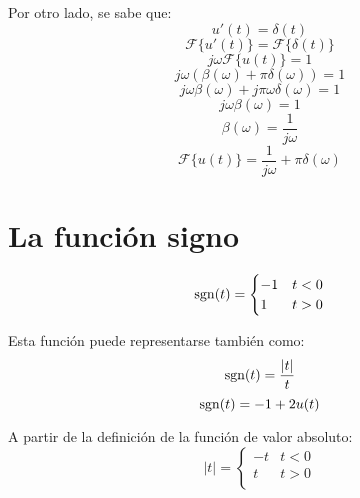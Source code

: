 Por otro lado, se sabe que:
\begin{equation*}
    u'(t)=\delta(t)
\end{equation*}
\begin{equation*}
    \mathcal{F}\{u'(t)\}=\mathcal{F}\{\delta(t)\}
\end{equation*}
\begin{equation*}
    j\omega\mathcal{F}\{u(t)\}=1
\end{equation*}
\begin{equation*}
    j\omega(\beta(\omega)+\pi\delta(\omega))=1
\end{equation*}
\begin{equation*}
    j\omega\beta(\omega)+j\pi\omega\delta(\omega)=1
\end{equation*}
\begin{equation*}
    j\omega\beta(\omega)=1
\end{equation*}
\begin{equation*}
    \beta(\omega)=\frac{1}{j\omega}
\end{equation*}
\begin{equation}
    \mathcal{F}\{u(t)\}=\frac{1}{j\omega}+\pi\delta(\omega)
\end{equation}

\section{La función signo}
\begin{equation}
    \operatorname{sgn}(t)=\begin{cases}
        -1&t<0\\
        1&t>0\\
    \end{cases}
\end{equation}
\begin{figure}[H]
    \centering
    
\end{figure}

Esta función puede representarse también como:
\begin{equation*}
    \operatorname{sgn}(t)=\frac{|t|}{t}
\end{equation*}
\begin{equation*}
    \operatorname{sgn}(t)=-1+2u(t)
\end{equation*}

A partir de la definición de la función de valor absoluto:
\begin{equation*}
    |t|=\begin{cases}
        -t&t<0\\
        t&t>0\\
    \end{cases}
\end{equation*}

